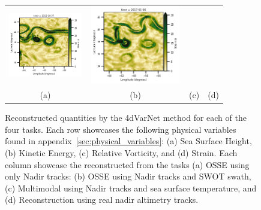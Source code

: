 \begin{figure}[ht!]
\begin{center}
\begin{tabular}{cccc}
\includegraphics[trim={13mm 0 19mm 5mm},clip, width=3.2cm,height=3.4cm]{00_Oceanbench/content/figures/fourdvarnet_figs/osse_gf_nadir_sst_strain.png} &
\includegraphics[trim={13mm 0 0 5mm},clip,width=4.0cm,height=3.4cm]{00_Oceanbench/content/figures/fourdvarnet_figs/ose_gf_strain.png} \\
(a) & (b) & (c) & (d)
\end{tabular}
\vspace{-3mm}
\caption{
Reconstructed quantities by the 4dVarNet method for each of the four tasks.
Each row showcases the following physical variables found in appendix~\ref{sec:physical_variables}: (a) Sea Surface Height, (b) Kinetic Energy, (c) Relative Vorticity, and (d) Strain. 
Each column showcase the reconstructed from the tasks (a) OSSE using only Nadir tracks: (b) OSSE using Nadir tracks and SWOT swath, (c) Multimodal using Nadir tracks and sea surface temperature, and (d) Reconstruction using real nadir altimetry tracks.}
\vspace{-5mm}
\label{fig:oceanbench_maps_4dvarnet}
\end{center}
\end{figure}





% 


